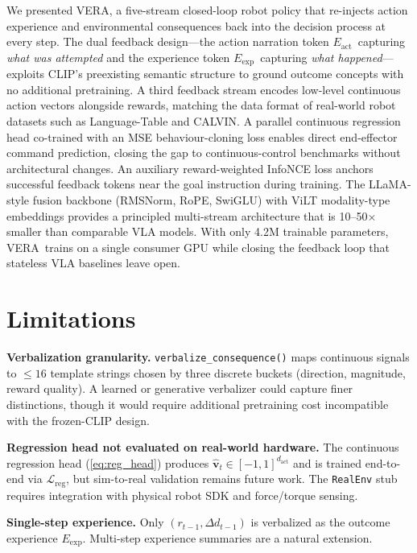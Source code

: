 \documentclass{article}
\newcommand{\modelname}{\textsc{VERA}\xspace}
\newcommand{\Lact}{$E_{\mathrm{act}}$\xspace}   %
\newcommand{\Lexp}{$E_{\mathrm{exp}}$\xspace}   %
\begin{document}
We presented \modelname, a five-stream closed-loop robot policy that
re-injects action experience and environmental consequences back into
the decision process at every step.
The dual feedback design---the action narration token \Lact\ capturing
\emph{what was attempted} and the experience token \Lexp\ capturing
\emph{what happened}---exploits CLIP's preexisting semantic structure
to ground outcome concepts with no additional pretraining.
A third feedback stream encodes low-level continuous action vectors
alongside rewards, matching the data format of real-world robot
datasets such as Language-Table and CALVIN.
A parallel continuous regression head co-trained with an MSE
behaviour-cloning loss enables direct end-effector command prediction,
closing the gap to continuous-control benchmarks without architectural
changes.
An auxiliary reward-weighted InfoNCE loss anchors successful
feedback tokens near the goal instruction during training.
The LLaMA-style fusion backbone (RMSNorm, RoPE, SwiGLU) with ViLT
modality-type embeddings provides a principled multi-stream architecture
that is 10--50$\times$ smaller than comparable VLA models.
With only 4.2M trainable parameters, \modelname\ trains on a single
consumer GPU while closing the feedback loop that stateless VLA
baselines leave open.

\section*{Limitations}

\textbf{Verbalization granularity.}
\texttt{verbalize\_consequence()} maps continuous signals to $\leq16$
template strings chosen by three discrete buckets (direction,
magnitude, reward quality).
A learned or generative verbalizer could capture finer distinctions,
though it would require additional pretraining cost incompatible with
the frozen-CLIP design.

\textbf{Regression head not evaluated on real-world hardware.}
The continuous regression head (\cref{eq:reg_head}) produces
$\hat{\mathbf{v}}_t\!\in\![-1,1]^{d_{\mathrm{act}}}$ and is trained
end-to-end via $\mathcal{L}_{\mathrm{reg}}$, but sim-to-real validation
remains future work.
The \texttt{RealEnv} stub requires integration with physical robot
SDK and force/torque sensing.

\textbf{Single-step experience.}
Only $(r_{t-1}, \Delta d_{t-1})$ is verbalized as the outcome experience \Lexp.
Multi-step experience summaries are a natural extension.
\end{document}
